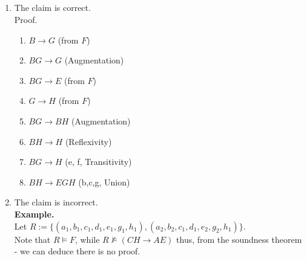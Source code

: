 \subsection{}
\begin{enumerate}
	\item The claim is correct.\\
		Proof.\\
		\begin{enumerate}
			\item $B\rightarrow G$ (from $F$)
			\item $BG\rightarrow G$ (Augmentation)
			\item $BG\rightarrow E$ (from $F$)
			\item $G\rightarrow H$ (from $F$)
			\item $BG\rightarrow BH$ (Augmentation)
			\item $BH\rightarrow H$ (Reflexivity)
			\item $BG\rightarrow H$ (e, f, Transitivity)
			\item $BH\rightarrow EGH$ (b,c,g, Union)
		\end{enumerate}
		\item The claim is incorrect.\\
		\textbf{Example.}\\
		Let $R := \{(a_1, b_1, c_1, d_1, e_1, g_1, h_1), (a_2, b_2, c_1, d_1, e_2, g_2, h_1)\}$.\\
		Note that $R\models F$, while $R\not\models (CH\rightarrow AE)$ thus,
		from the soundness theorem - we can deduce there is no proof.
\end{enumerate}

